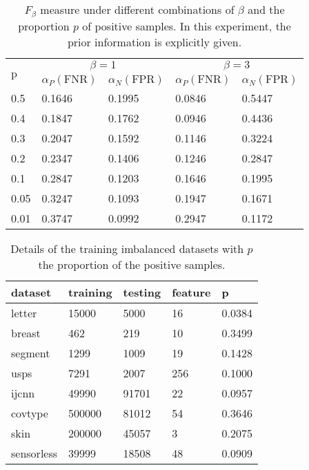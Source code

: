 \documentclass[15pt]{article}
\begin{document}
\begin{table}
\caption{$F_\beta$ measure under different combinations of $\beta$ and the proportion $p$ of
positive samples. In this experiment, the prior information is explicitly given.
}\label{Experiment-1}
\begin{center}
\begin{small}
\begin{sc}
\begin{tabular}{l|ll|ll|}
\toprule
\multirow{2}{*}{p}  & \multicolumn{2}{c|}{$\beta =1 $} & \multicolumn{2}{c|}{$\beta =3$}\\  \cline{2-5}
 & $\alpha_P(\mbox{FNR})$ & $\alpha_N(\mbox{FPR})$ & $\alpha_P(\mbox{FNR})$ & $\alpha_N(\mbox{FPR})$ \\
\midrule
0.5   & 0.1646 & 0.1995 & 0.0846 & 0.5447  \\
0.4   & 0.1847 & 0.1762 & 0.0946 & 0.4436  \\
0.3   & 0.2047 & 0.1592 & 0.1146 & 0.3224  \\
0.2   & 0.2347 & 0.1406 & 0.1246 & 0.2847  \\
0.1   & 0.2847 & 0.1203 & 0.1646 & 0.1995  \\
0.05  & 0.3247 & 0.1093 & 0.1947 & 0.1671  \\
0.01  & 0.3747 & 0.0992 & 0.2947 & 0.1172  \\
\bottomrule
\end{tabular}
\end{sc}
\end{small}
\end{center}
\end{table}


\begin{table}
\caption{Details of the training imbalanced datasets with $p$ the proportion of the positive samples.
}\label{dataset}
\begin{center}
\begin{small}
\begin{sc}
\begin{tabular}{lllll}
\toprule
dataset    & training   & testing   & feature &  p  \\
\midrule
letter     & 15000      & 5000      & 16      & 0.0384 \\
breast     & 462        & 219       & 10      & 0.3499 \\
segment    & 1299       & 1009      & 19      & 0.1428 \\
usps       & 7291       & 2007      & 256     & 0.1000 \\
ijcnn      & 49990      & 91701     & 22      & 0.0957 \\
covtype    & 500000     & 81012     & 54      & 0.3646 \\
skin       & 200000     & 45057     & 3       & 0.2075 \\
sensorless & 39999      & 18508     & 48      & 0.0909 \\
\bottomrule
\end{tabular}
\end{sc}
\end{small}
\end{center}
\vskip -0.1in
\end{table}
\end{document}
